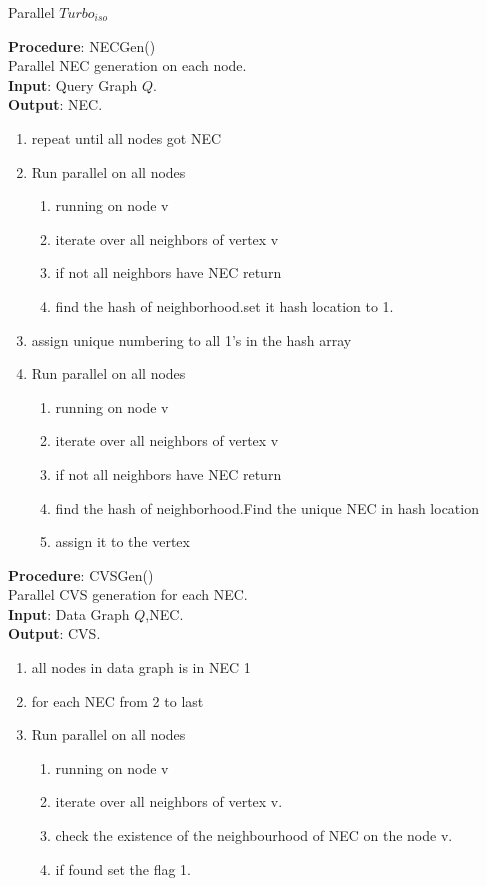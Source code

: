 \begin{breakablealgorithm}[H]
\caption{Parallel $Turbo_{iso}$}
\textbf{Procedure}: NECGen()\\
Parallel NEC generation on each node.\\
\textbf{Input}: Query Graph $Q$.\\
\textbf{Output}: NEC.\\
\begin{algorithmic}
\item \begin{enumerate}
\item repeat until all nodes got NEC
\item Run parallel on all nodes
\begin{enumerate}
\item running on node v
\item iterate over all neighbors of vertex v
\item if not all neighbors have NEC return
\item find the hash of neighborhood.set it hash location to 1.
\end{enumerate}
\item assign unique numbering to all 1's in the hash array
\item Run parallel on all nodes
\begin{enumerate}
\item running on node v
\item iterate over all neighbors of vertex v
\item if not all neighbors have NEC return
\item find the hash of neighborhood.Find the unique NEC in hash location
\item assign it to the vertex
\end{enumerate}
\end{enumerate}
\end{algorithmic}
\textbf{Procedure}: CVSGen()\\
Parallel CVS generation for each NEC.\\
\textbf{Input}: Data Graph $Q$,NEC.\\
\textbf{Output}: CVS.\\
\begin{algorithmic}
\item \begin{enumerate}
\item all nodes in data graph is in NEC 1
\item for each NEC from 2 to last
\item Run parallel on all nodes
\begin{enumerate}
\item running on node v
\item iterate over all neighbors of vertex v.
\item check the existence of the neighbourhood of NEC on the node v.
\item if found set the flag 1.
\end{enumerate}
\end{enumerate}
\end{algorithmic}


\end{breakablealgorithm}
